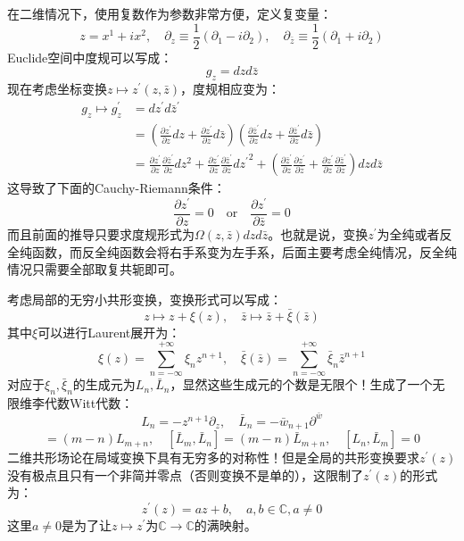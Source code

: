 	在二维情况下，使用复数作为参数非常方便，定义复变量：
	\[z=x^1+ix^2,\quad \partial_z\equiv\frac{1}{2}(\partial_1-i\partial_2),\quad \partial_{\bar z}\equiv\frac{1}{2}(\partial_1+i\partial_2)\]
	Euclide空间中度规可以写成：
	\begin{equation}
		g_z = dzd\bar z
	\end{equation}
	现在考虑坐标变换$z\mapsto z^\prime(z,\bar z)$，度规相应变为：
	\begin{equation}
		\begin{aligned}
			g_z\mapsto g^'_z&=dz^\prime d{\bar z}^\prime\\
			&=\left(\frac{\partial z^\prime}{\partial z}dz+\frac{\partial z^\prime}{\partial\bar z}d\bar z\right)
			\left(\frac{\partial \bar z^\prime}{\partial z}dz+\frac{\partial \bar z^\prime}{\partial\bar z}d\bar z\right)\\
			&=\frac{\partial z^\prime}{\partial z}\frac{\partial \bar z^\prime}{\partial z}dz^2+\frac{\partial z^\prime}{\partial \bar z}\frac{\partial \bar z^\prime}{\partial \bar z}{dz^\prime}^2+\left(\frac{\partial \bar z^\prime}{\partial  z}\frac{\partial  z^\prime}{\partial \bar z}+\frac{\partial z^\prime}{\partial z}\frac{\partial \bar z^\prime}{\partial \bar z}\right)dzd\bar z
		\end{aligned}
	\end{equation}
	这导致了下面的Cauchy-Riemann条件：
	\begin{equation}
		\frac{\partial z^\prime}{\partial z}=0\quad \text{or}\quad \frac{\partial z^\prime}{\partial \bar z}=0
	\end{equation}
	而且前面的推导只要求度规形式为$\Omega(z,\bar z)dzd\bar z$。也就是说，变换$z^\prime$为全纯或者反全纯函数，而反全纯函数会将右手系变为左手系，后面主要考虑全纯情况，反全纯情况只需要全部取复共轭即可。
	
	考虑局部的无穷小共形变换，变换形式可以写成：
	\[z\mapsto z+\xi(z),\quad \bar z\mapsto \bar z+\bar\xi(\bar z)\]
	其中$\xi$可以进行Laurent展开为：
	\[\xi(z)=\sum_{n=-\infty}^{+\infty}\xi_n z^{n+1} ,\quad \bar\xi(\bar z)=\sum_{n=-\infty}^{+\infty}\bar\xi_n \bar z^{n+1}\]
	对应于$\xi_n,\bar\xi_n$的生成元为$L_n,\bar L_n$，显然这些生成元的个数是无限个！生成了一个无限维李代数Witt代数：
	\begin{equation}
		L_n=-z^{n+1}\partial_z,\quad \bar L_n=-\bar w_{n+1}\partial^{\bar w}
	\end{equation}
	\begin{equation}
		[L_m,L_n]=(m-n)L_{m+n},\quad [\bar L_m,\bar L_n]=(m-n)\bar L_{m+n},\quad [L_n,\bar L_m]=0
	\end{equation}
	二维共形场论在局域变换下具有无穷多的对称性！但是全局的共形变换要求$z^\prime(z)$没有极点且只有一个非简并零点（否则变换不是单的），这限制了$z^\prime(z)$的形式为：
	\begin{equation}
		z^\prime(z)=a z+b,\quad a,b\in\mathbb{C}, a\neq 0
	\end{equation}
	这里$a\neq 0$是为了让$z\mapsto z^\prime$为$\mathbb{C}\to \mathbb{C}$的满映射。
	
